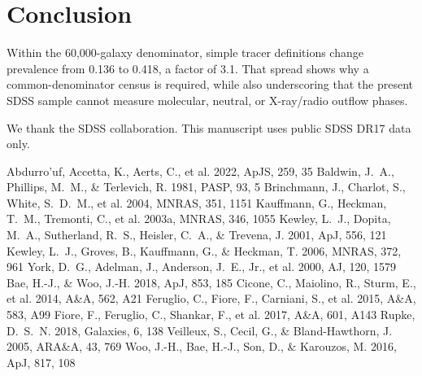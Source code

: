 \documentclass[twocolumn]{aastex631}
\begin{document}
\section{Conclusion}\label{sec:conclusion}
Within the 60,000-galaxy denominator, simple tracer definitions change prevalence from 0.136 to 0.418, a factor of 3.1. That spread shows why a common-denominator census is required, while also underscoring that the present SDSS sample cannot measure molecular, neutral, or X-ray/radio outflow phases.

\acknowledgments
We thank the SDSS collaboration. This manuscript uses public SDSS DR17 data only.


\begin{thebibliography}{}
 Abdurro'uf, Accetta, K., Aerts, C., et al. 2022, ApJS, 259, 35
 Baldwin, J.~A., Phillips, M.~M., \& Terlevich, R. 1981, PASP, 93, 5
 Brinchmann, J., Charlot, S., White, S.~D.~M., et al. 2004, MNRAS, 351, 1151
 Kauffmann, G., Heckman, T.~M., Tremonti, C., et al. 2003a, MNRAS, 346, 1055
 Kewley, L.~J., Dopita, M.~A., Sutherland, R.~S., Heisler, C.~A., \& Trevena, J. 2001, ApJ, 556, 121
 Kewley, L.~J., Groves, B., Kauffmann, G., \& Heckman, T. 2006, MNRAS, 372, 961
 York, D.~G., Adelman, J., Anderson, J.~E., Jr., et al. 2000, AJ, 120, 1579
 Bae, H.-J., \& Woo, J.-H. 2018, ApJ, 853, 185
 Cicone, C., Maiolino, R., Sturm, E., et al. 2014, A\&A, 562, A21
 Feruglio, C., Fiore, F., Carniani, S., et al. 2015, A\&A, 583, A99
 Fiore, F., Feruglio, C., Shankar, F., et al. 2017, A\&A, 601, A143
 Rupke, D.~S.~N. 2018, Galaxies, 6, 138
 Veilleux, S., Cecil, G., \& Bland-Hawthorn, J. 2005, ARA\&A, 43, 769
 Woo, J.-H., Bae, H.-J., Son, D., \& Karouzos, M. 2016, ApJ, 817, 108
\end{thebibliography}
\end{document}
